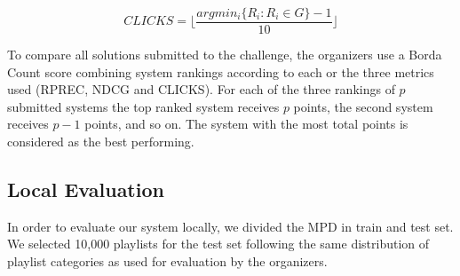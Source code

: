 \begin{displaymath}
  CLICKS = \lfloor\frac{arg min_{i} \{R_{i}:R_{i} \in G\} - 1}{10}\rfloor
\end{displaymath}

To compare all solutions submitted to the challenge, the organizers use a Borda Count score combining system rankings according to each or the three metrics used (RPREC, NDCG and CLICKS). For each of the three rankings of $p$ submitted systems the top ranked system receives $p$ points, the second system receives $p-1$ points, and so on. The system with the most total points is considered as the best performing.

\subsection{Local Evaluation}

In order to evaluate our system locally, we divided the MPD in train and test set. We selected 10,000 playlists for the test set following the same distribution of playlist categories as used for evaluation by the organizers.


